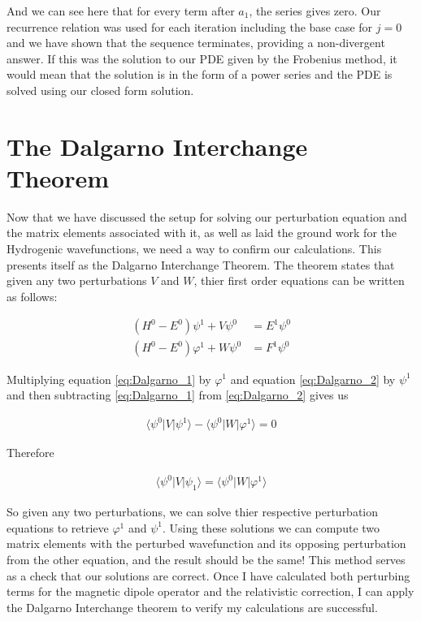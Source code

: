         And we can see here that for every term after $a_1$, the series gives zero. Our recurrence relation was used for each iteration including the base case for $j = 0$ and we have shown that the sequence terminates, providing a non-divergent answer. If this was the solution to our PDE given by the Frobenius method, it would mean that the solution is in the form of a power series and the PDE is solved using our closed form solution.

    \section{The Dalgarno Interchange Theorem} \label{sec:Dalgarno_Interchange_Theorem}
        Now that we have discussed the setup for solving our perturbation equation and the matrix elements associated with it, as well as laid the ground work for the Hydrogenic wavefunctions, we need a way to confirm our calculations. This presents itself as the Dalgarno Interchange Theorem. The theorem states that given any two perturbations $V$ and $W$, thier first order equations can be written as follows:

        \begin{align}
            \left( H^0 - E^0 \right) \psi^1 + V \psi^0 &= E^1 \psi^0 \label{eq:Dalgarno_1}\\
            \left( H^0 - E^0 \right) \varphi^1 + W \psi^0 &= F^1 \psi^0 \label{eq:Dalgarno_2}
        \end{align}

        Multiplying equation \eqref{eq:Dalgarno_1} by $\varphi^1$ and equation \eqref{eq:Dalgarno_2} by $\psi^1$ and then subtracting \eqref{eq:Dalgarno_1} from \eqref{eq:Dalgarno_2} gives us

        \begin{align}
            \langle \psi^0 \vert V \vert \psi^1 \rangle - \langle \psi^0 \vert W \vert \varphi^1 \rangle = 0
        \end{align}

        Therefore 

        \begin{align}
            \langle \psi^0 \vert V \vert \psi_1 \rangle = \langle \psi^0 \vert W \vert \varphi^1 \rangle
        \end{align}

        So given any two perturbations, we can solve thier respective perturbation equations to retrieve $\varphi^1$ and $\psi^1$. Using these solutions we can compute two matrix elements with the perturbed wavefunction and its opposing perturbation from the other equation, and the result should be the same! This method serves as a check that our solutions are correct. Once I have calculated both perturbing terms for the magnetic dipole operator and the relativistic correction, I can apply the Dalgarno Interchange theorem to verify my calculations are successful.
    
    